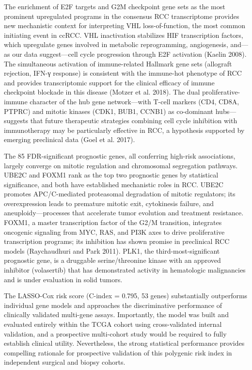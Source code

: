 \documentclass[
  12pt,
]{article}
\begin{document}
The enrichment of E2F targets and G2M checkpoint gene sets as the most
prominent upregulated programs in the consensus RCC transcriptome
provides new mechanistic context for interpreting VHL loss-of-function,
the most common initiating event in ccRCC. VHL inactivation stabilizes
HIF transcription factors, which upregulate genes involved in metabolic
reprogramming, angiogenesis, and---as our data suggest---cell cycle
progression through E2F activation (Kaelin 2008). The simultaneous
activation of immune-related Hallmark gene sets (allograft rejection,
IFN-γ response) is consistent with the immune-hot phenotype of RCC and
provides transcriptomic support for the clinical efficacy of immune
checkpoint blockade in this disease (Motzer et al. 2018). The dual
proliferative-immune character of the hub gene network---with T-cell
markers (CD4, CD8A, PTPRC) and mitotic kinases (CDK1, BUB1, CCNB1) as
co-dominant hubs---suggests that future therapeutic strategies combining
cell cycle inhibition with immunotherapy may be particularly effective
in RCC, a hypothesis supported by emerging preclinical data (Goel et al.
2017).

The 85 FDR-significant prognostic genes, all conferring high-risk
associations, largely converge on mitotic regulation and chromosomal
segregation pathways. UBE2C and FOXM1 rank as the top two prognostic
genes by statistical significance, and both have established mechanistic
roles in RCC. UBE2C promotes APC/C-mediated proteasomal degradation of
mitotic regulators; its overexpression leads to premature mitotic exit,
cytokinesis failure, and aneuploidy---processes that accelerate tumor
evolution and treatment resistance. FOXM1, a master transcription factor
of the G2/M transition, integrates oncogenic signaling from MYC, RAS,
and PI3K axes to drive proliferative transcription programs; its
inhibition has shown promise in preclinical RCC models (Raychaudhuri and
Park 2011). PLK1, the third-most-significant prognostic gene, is a
druggable serine/threonine kinase with an approved inhibitor
(volasertib) that has demonstrated activity in hematologic malignancies
and is under evaluation in solid tumors.

The LASSO-Cox risk score (C-index = 0.795, 53 genes) substantially
outperforms individual gene models and approaches the discriminative
performance of clinically validated multi-gene assays. Importantly, the
model was built and evaluated entirely within the TCGA cohort using
cross-validated internal validation, and a prospective multi-cohort
study would be required to fully establish clinical utility.
Nevertheless, the strong statistical performance provides compelling
rationale for prospective validation of this polygenic risk index in
independent surgical and biopsy cohorts.
\end{document}
